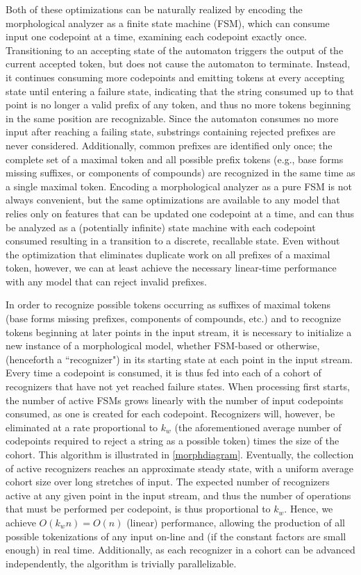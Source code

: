 Both of these optimizations can be naturally realized by encoding the morphological analyzer as a finite state machine (FSM), which can consume input one codepoint at a time, examining each codepoint exactly once. Transitioning to an accepting state of the automaton triggers the output of the current accepted token, but does not cause the automaton to terminate. Instead, it continues consuming more codepoints and emitting tokens at every accepting state until entering a failure state, indicating that the string consumed up to that point is no longer a valid prefix of any token, and thus no more tokens beginning in the same position are recognizable. Since the automaton consumes no more input after reaching a failing state, substrings containing rejected prefixes are never considered. Additionally, common prefixes are identified only once; the complete set of a maximal token and all possible prefix tokens (e.g., base forms missing suffixes, or components of compounds) are recognized in the same time as a single maximal token. Encoding a morphological analyzer as a pure FSM is not always convenient, but the same optimizations are available to any model that relies only on features that can be updated one codepoint at a time, and can thus be analyzed as a (potentially infinite) state machine with each codepoint consumed resulting in a transition to a discrete, recallable state. Even without the optimization that eliminates duplicate work on all prefixes of a maximal token, however, we can at least achieve the necessary linear-time performance with any model that can reject invalid prefixes.

In order to recognize possible tokens occurring as suffixes of maximal tokens (base forms missing prefixes, components of compounds, etc.) and to recognize tokens beginning at later points in the input stream, it is necessary to initialize a new instance of a morphological model, whether FSM-based or otherwise, (henceforth a ``recognizer") in its starting state at each point in the input stream. Every time a codepoint is consumed, it is thus fed into each of a cohort of recognizers that have not yet reached failure states. When processing first starts, the number of active FSMs grows linearly with the number of input codepoints consumed, as one is created for each codepoint. Recognizers will, however, be eliminated at a rate proportional to $k_w$ (the aforementioned average number of codepoints required to reject a string as a possible token) times the size of the cohort. This algorithm is illustrated in \ref{morphdiagram}. Eventually, the collection of active recognizers reaches an approximate steady state, with a uniform average cohort size over long stretches of input. The expected number of recognizers active at any given point in the input stream, and thus the number of operations that must be performed per codepoint, is thus proportional to $k_w$. Hence, we achieve $O(k_{w}n) = O(n)$ (linear) performance, allowing the production of all possible tokenizations of any input on-line and (if the constant factors are small enough) in real time. Additionally, as each recognizer in a cohort can be advanced independently, the algorithm is trivially parallelizable.

